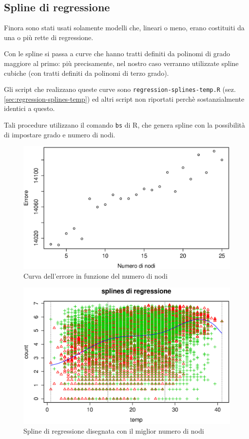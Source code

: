 \subsection{Spline di regressione}\label{sec:regression-splines}
Finora sono stati usati solamente modelli che, lineari o meno, erano costituiti
da una o più rette di regressione.

Con le spline si passa a curve che hanno tratti definiti da polinomi di grado
maggiore al primo: più precisamente, nel nostro caso verranno utilizzate
spline cubiche (con tratti definiti da polinomi di terzo grado).

Gli script che realizzano queste curve sono \texttt{regression-splines-temp.R}
(sez. \ref{sec:regression-splines-temp}) ed altri script non riportati perchè
sostanzialmente identici a questo.

Tali procedure utilizzano il comando \texttt{bs} di R, che genera spline con la
possibilità di impostare grado e numero di nodi.

\begin{figure}[H]
  \centering
  \includegraphics[width=.7\columnwidth]{images/non-linear/regression-splines-error-knots.eps}
  \caption{Curva dell'errore in funzione del numero di nodi}
  \label{fig:regression-optimal-knots}
\end{figure}

\begin{figure}[H]
  \centering
  \includegraphics[width=.7\columnwidth]{images/non-linear/regression-draw.eps}
  \caption{Spline di regressione disegnata con il miglior numero di nodi}
  \label{fig:regression-draw}
\end{figure}


